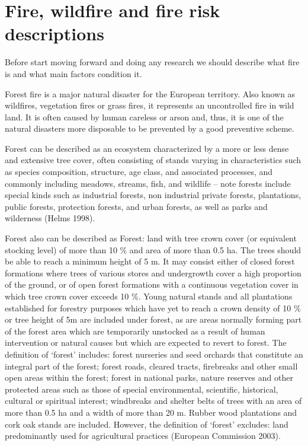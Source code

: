 {{\section{Fire, wildfire and fire risk descriptions}
	Before start moving forward and doing any research we should describe what fire is and what main factors condition it.
	
	Forest fire is a major natural disaster for the European territory. Also known as wildfires, vegetation fires or grass fires, it represents an uncontrolled fire in wild land. It is often caused by human careless or arson and, thus, it is one of the natural disasters more disposable to be prevented by a good preventive scheme.
	
	Forest can be described as an ecosystem characterized by a more or less dense and extensive tree cover, often consisting of stands varying in characteristics such as species composition, structure, age class, and associated processes, and commonly including meadows, streams, fish, and wildlife – note forests include special kinds such as industrial forests, non industrial private forests, plantations, public forests, protection forests, and urban forests, as well as parks and wilderness (Helms 1998).
	
	Forest also can be described as Forest: land with tree crown cover (or equivalent stocking level) of more than 10 \% and area of more than 0.5 ha. The trees should be able to reach a minimum height of 5 m. It may consist either of closed forest formations where trees of various stores and undergrowth cover a high proportion of the ground, or of open forest formations with a continuous vegetation cover in which tree crown cover exceeds 10 \%. Young natural stands and all plantations established for forestry purposes which have yet to reach a crown density of 10 \% or tree height of 5m are included under forest, as are areas normally forming part of the forest area which are temporarily unstocked as a result of human intervention or natural causes but which are expected to revert to forest. The definition of ‘forest’ includes: forest nurseries and seed orchards that constitute an integral part of the forest; forest roads, cleared tracts, firebreaks and other small open areas within the forest; forest in national parks, nature reserves and other protected areas such as those of special environmental, scientific, historical, cultural or spiritual interest; windbreaks and shelter belts of trees with an area of more than 0.5 ha and a width of more than 20 m. Rubber wood plantations and cork oak stands are included. However, the definition of ‘forest’ excludes: land predominantly used for agricultural practices (European Commission 2003).
	
}}
